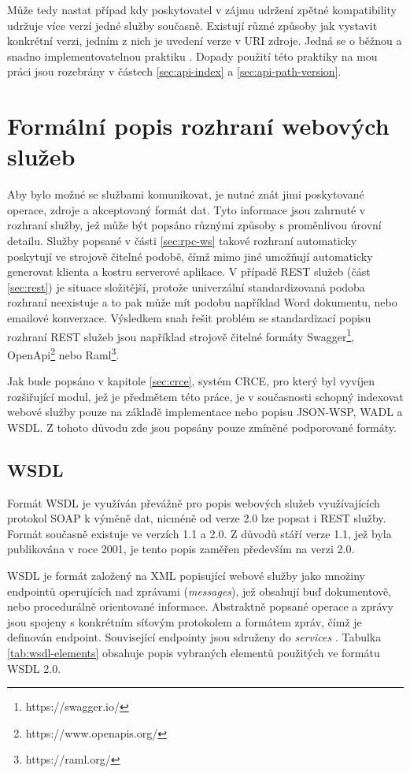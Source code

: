 \documentclass[czech,DP]{thesiskiv}
\begin{document}
Může tedy nastat případ kdy poskytovatel v zájmu udržení zpětné kompatibility udržuje více verzí jedné služby současně. Existují různé způsoby jak vystavit konkrétní verzi, jedním z nich je uvedení verze v URI zdroje. Jedná se o běžnou a snadno implementovatelnou praktiku \cite{restApiVersion}\cite{restfulWebServices}. Dopady použití této praktiky na mou práci jsou rozebrány v částech \ref{sec:api-index} a \ref{sec:api-path-version}.


\section{Formální popis rozhraní webových služeb}
\label{sec:api-description-formats}

Aby bylo možné se službami komunikovat, je nutné znát jimi poskytované operace, zdroje a akceptovaný formát dat. Tyto informace jsou zahrnuté v rozhraní služby, jež může být popsáno různými způsoby s proměnlivou úrovní detailu. Služby popsané v části \ref{sec:rpc-ws} takové rozhraní automaticky poskytují ve strojově čitelné podobě, čímž mimo jiné umožňují automaticky generovat klienta a kostru serverové aplikace. V případě REST služeb (část \ref{sec:rest}) je situace složitější, protože univerzální standardizovaná podoba rozhraní neexistuje a to pak může mít podobu například Word dokumentu, nebo emailové konverzace. Výsledkem snah řešit problém se standardizací popisu rozhraní REST služeb jsou například strojově čitelné formáty Swagger\footnote{https://swagger.io/}, OpenApi\footnote{https://www.openapis.org/} nebo Raml\footnote{https://raml.org/}. 

Jak bude popsáno v kapitole \ref{sec:crce}, systém CRCE, pro který byl vyvíjen rozšiřující modul, jež je předmětem této práce, je v současnosti schopný indexovat webové služby pouze na základě implementace nebo popisu JSON-WSP, WADL a WSDL. Z tohoto důvodu zde jsou popsány pouze zmíněné podporované formáty.

\subsection{WSDL}

Formát WSDL je využíván převážně pro popis webových služeb využívajících protokol SOAP k výměně dat, nicméně od verze 2.0 lze popsat i REST služby. Formát současně existuje ve verzích 1.1 a 2.0. Z důvodů stáří verze 1.1, jež byla publikována v roce 2001, je tento popis zaměřen především na verzi 2.0. 

WSDL je formát založený na XML popisující webové služby jako množiny endpointů operujících nad zprávami (\textit{messages}), jež obsahují buď dokumentově, nebo procedurálně orientované informace. Abstraktně popsané operace a zprávy jsou spojeny s konkrétním síťovým protokolem a formátem zpráv, čímž je definován endpoint. Související endpointy jsou sdruženy do \textit{services} \cite{wsdl2}. Tabulka \ref{tab:wsdl-elements} obsahuje popis vybraných elementů použitých ve formátu WSDL 2.0.
\end{document}

